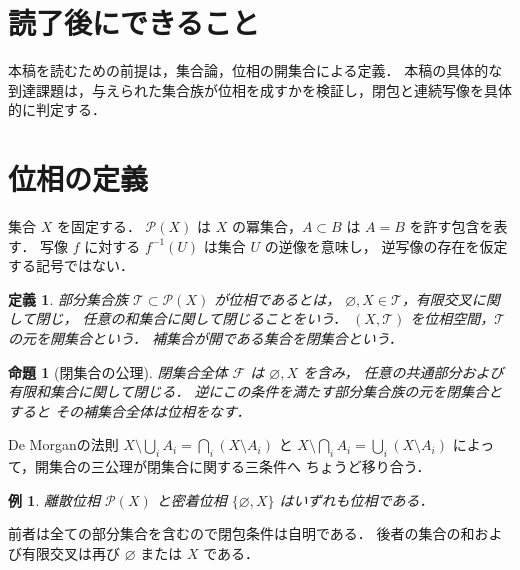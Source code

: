 \documentclass[a5paper,10pt,onecolumn]{jsarticle}
\makeatletter
\theoremstyle{mathnotetheorem}
\newtheorem{definition}[theorem]{定義}
\newtheorem{proposition}[theorem]{命題}
\newtheorem{example}[theorem]{例}
\renewcommand{\proofname}{証明}
\renewenvironment{proof}[1][\proofname]{%
  \par\pushQED{\qed}\normalfont\topsep4\p@\@plus2\p@\relax
  \trivlist\item[\hskip\labelsep\bfseries #1]\ignorespaces
}{\popQED\endtrivlist\@endpefalse}
\makeatother
\begin{document}
\section*{読了後にできること}
本稿を読むための前提は，集合論，位相の開集合による定義．
本稿の具体的な到達課題は，与えられた集合族が位相を成すかを検証し，閉包と連続写像を具体的に判定する．


\section{位相の定義}
集合 $X$ を固定する．
$\mathcal P(X)$ は $X$ の冪集合，$A\subset B$ は
$A=B$ を許す包含を表す．
写像 $f$ に対する $f^{-1}(U)$ は集合 $U$ の逆像を意味し，
逆写像の存在を仮定する記号ではない．
\begin{definition}
部分集合族 $\mathcal T\subset\mathcal P(X)$ が位相であるとは，
$\varnothing,X\in\mathcal T$，有限交叉に関して閉じ，
任意の和集合に関して閉じることをいう．
$(X,\mathcal T)$ を位相空間，$\mathcal T$ の元を開集合という．
補集合が開である集合を閉集合という．
\end{definition}
\begin{proposition}[閉集合の公理]
閉集合全体 $\mathcal F$ は $\varnothing,X$ を含み，
任意の共通部分および有限和集合に関して閉じる．
逆にこの条件を満たす部分集合族の元を閉集合とすると
その補集合全体は位相をなす．
\end{proposition}
\begin{proof}
De Morganの法則
$X\setminus\bigcup_iA_i=\bigcap_i(X\setminus A_i)$ と
$X\setminus\bigcap_i A_i=\bigcup_i(X\setminus A_i)$
によって，開集合の三公理が閉集合に関する三条件へ
ちょうど移り合う．
\end{proof}
\begin{example}
離散位相 $\mathcal P(X)$ と密着位相
$\{\varnothing,X\}$ はいずれも位相である．
\end{example}
\begin{proof}
前者は全ての部分集合を含むので閉包条件は自明である．
後者の集合の和および有限交叉は再び
$\varnothing$ または $X$ である．
\end{proof}
\end{document}
